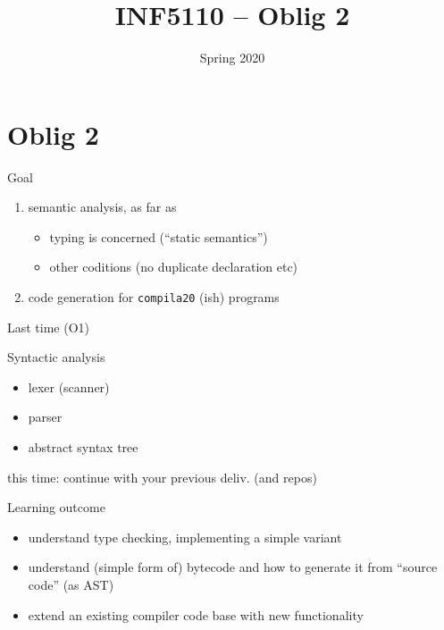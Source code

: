 \documentclass{beamer}
\date{Spring 2020}
\title{INF5110 -- Oblig 2}
\renewcommand{\maketitle}{}
\begin{document}
\maketitle
\chapter{Oblig 2}
\label{sec:orgaef7520}


\begin{frame}[label={sec:orgab7f371},fragile]{Goal}
 \begin{enumerate}
\item \alert{semantic  analysis}, as far as 
\begin{itemize}
\item \alert{typing} is concerned (``static semantics'')
\item other coditions (no duplicate declaration etc)
\end{itemize}

\item \alert{code generation} for \texttt{compila20} (ish) programs
\end{enumerate}
\end{frame}






\begin{frame}[label={sec:orgb3cf77b}]{Last time (O1)}
\begin{block}{Syntactic analysis}
\begin{itemize}
\item lexer (scanner)
\item parser
\item abstract syntax tree
\end{itemize}
\end{block}



\alert{this time}: continue with your previous deliv. (and repos)
\end{frame}



\begin{frame}[label={sec:org6cbc92b}]{Learning outcome}
\begin{itemize}
\item understand type checking, implementing a simple variant
\end{itemize}


\begin{itemize}
\item understand (simple form of) bytecode and how to generate it from ``source
code'' (as AST)

\item extend an existing compiler code base with new functionality
\end{itemize}
\end{frame}
\end{document}
